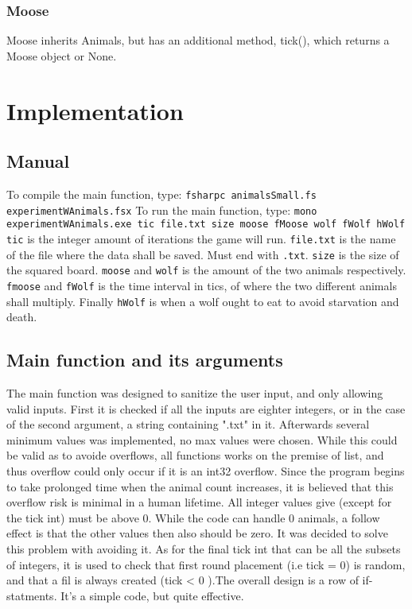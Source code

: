 \documentclass{article}
\begin{document}
    
    \subsubsection{Moose}
    	Moose inherits Animals, but has an additional method, tick(), which returns a Moose object or None.

    \section{Implementation}
        \subsection{Manual}
    To compile the main function, type: \newline \verb|fsharpc animalsSmall.fs experimentWAnimals.fsx|\newline
    To run the main function, type: \newline \verb|mono experimentWAnimals.exe tic file.txt size moose fMoose wolf fWolf hWolf|\newline
    \verb|tic| is the integer amount of iterations the game will run. \verb|file.txt| is the name of the file where the data shall be saved. Must end with \verb|.txt|. \verb|size| is the size of the squared board. \verb|moose|
    and \verb|wolf| is the amount of the two animals respectively. \verb|fmoose| and \verb|fWolf| is the time interval in tics, of where the two different animals shall multiply. Finally \verb|hWolf| is when a wolf ought to eat to avoid starvation and death.
    
     \subsection{Main function and its arguments}
    The main function was designed to sanitize the user input, and only allowing valid inputs. First it is checked if all the inputs are eighter integers, or in the case of the second argument, a string containing ".txt" in it. \newline Afterwards several minimum values was implemented, no max values were chosen. While this could be valid as to avoide overflows, all functions works on the premise of list, and thus overflow could only occur if it is an int32 overflow. Since the program begins to take prolonged time when the animal count increases, it is believed that this overflow risk is minimal in a human lifetime. All integer values give (except for the tick int) must be above 0. \newline While the code can handle 0 animals, a follow effect is that the other values then also should be zero. It was decided to solve this problem with avoiding it. As for the final tick int that can be all the subsets of integers, it is used to check that first round placement (i.e tick = 0) is random, and that a fil is always created (tick < 0 ).\newline The overall design is a row of if-statments. It's a simple code, but quite effective. 
\end{document}
